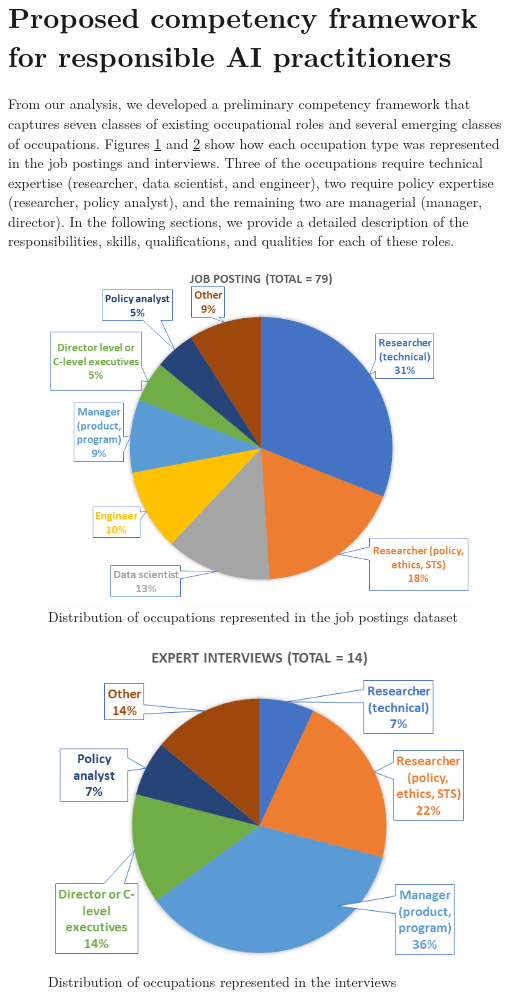 \documentclass[sigconf]{acmart}
\begin{document}
\section{Proposed competency framework for responsible AI practitioners}
\label{finding}
From our analysis, we developed a preliminary competency framework that captures seven classes of existing occupational roles and several emerging classes of occupations. Figures \ref{postingchart} and \ref{interviewchart} show how each occupation type was represented in the job postings and interviews. Three of the occupations require technical expertise (researcher, data scientist, and engineer), two require policy expertise (researcher, policy analyst), and the remaining two are managerial (manager, director). In the following sections, we provide a detailed description of the responsibilities, skills, qualifications, and qualities for each of these roles. 


\begin{figure}[ht]
  \centering
  \includegraphics[width=0.9\linewidth]{fig1comp.png}
  \caption{Distribution of occupations represented in the job postings dataset}
  \label{postingchart}
\end{figure}
\begin{figure}[ht]
  \centering
  \includegraphics[width=0.9\linewidth]{fig2comp.png}
  \caption{Distribution of occupations represented in the interviews}
  \label{interviewchart}
\end{figure}
\end{document}
